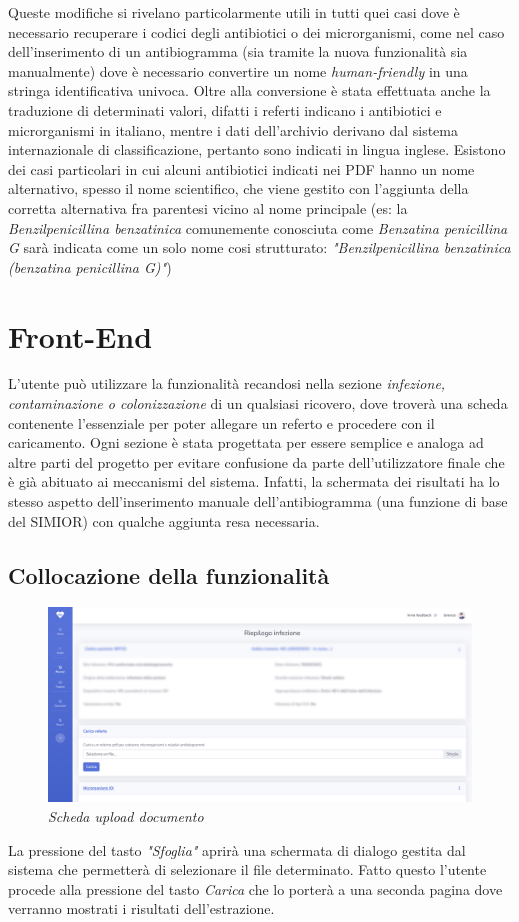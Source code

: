 Queste modifiche si rivelano particolarmente utili in tutti quei casi dove è necessario recuperare i codici degli antibiotici o dei microrganismi, come nel caso dell'inserimento di un antibiogramma (sia tramite la nuova funzionalità sia manualmente) dove è necessario convertire un nome \textit{human-friendly} in una stringa identificativa univoca.
Oltre alla conversione è stata effettuata anche la traduzione di determinati valori, difatti i referti indicano i antibiotici e microrganismi in italiano, mentre i dati dell'archivio derivano dal sistema internazionale di classificazione, pertanto sono indicati in lingua inglese. Esistono dei casi particolari in cui alcuni antibiotici indicati nei PDF hanno un nome alternativo, spesso il nome scientifico, che viene gestito con l'aggiunta della corretta alternativa fra parentesi vicino al nome principale (es: la \textit{Benzilpenicillina benzatinica} comunemente conosciuta come \textit{Benzatina penicillina G} sarà indicata come un solo nome cosi strutturato: \textit{"Benzilpenicillina benzatinica (benzatina penicillina G)"})
\newpage
\section{Front-End}
L'utente può utilizzare la funzionalità recandosi nella sezione \textit{infezione, contaminazione o colonizzazione} di un qualsiasi ricovero, dove troverà una scheda contenente l'essenziale per poter allegare un referto e procedere con il caricamento.
Ogni sezione è stata progettata per essere semplice e analoga ad altre parti del progetto per evitare confusione da parte dell'utilizzatore finale che è già abituato ai meccanismi del sistema. Infatti, la schermata dei risultati ha lo stesso aspetto dell'inserimento manuale dell'antibiogramma (una funzione di base del SIMIOR) con qualche aggiunta resa necessaria.
\subsection{Collocazione della funzionalità}
\begin{figure}[h!]
	\centering
	\includegraphics[width=.99\columnwidth]{images/feature_location.png}
	\caption{\textit{Scheda upload documento}}
	\label{fig:feature_location}
\end{figure}
La pressione del tasto \textit{"Sfoglia"} aprirà una schermata di dialogo gestita dal sistema che permetterà di selezionare il file determinato. Fatto questo l'utente procede alla pressione del tasto \textit{Carica} che lo porterà a una seconda pagina dove verranno mostrati i risultati dell'estrazione.
\newpage
